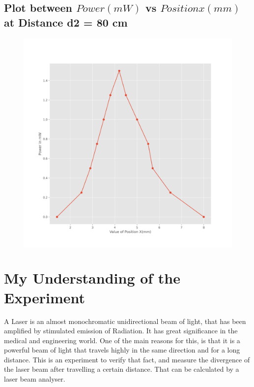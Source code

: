 \documentclass[11pt]{article}
\begin{document}
\subsection{Plot between $\textit{Power} (mW)$ vs $\textit{Position} x(mm)$ at Distance d2 = 80 cm}
\begin{figure}[H]
	\centering
	\includegraphics[scale=0.6]{fig2.png}
	\label{it}
\end{figure}

\section{My Understanding of the Experiment}
A Laser is an almost monochromatic unidirectional beam of light, that has been amplified by stimulated emission of Radiation. It has great significance in the medical and engineering world. 
One of the main reasons for this, is that it is a powerful beam of light that travels highly in the same direction and for a long distance. This is an experiment to verify that fact, and measure
the divergence of the laser beam after travelling a certain distance. That can be calculated by a laser beam analyser. 
\end{document}

